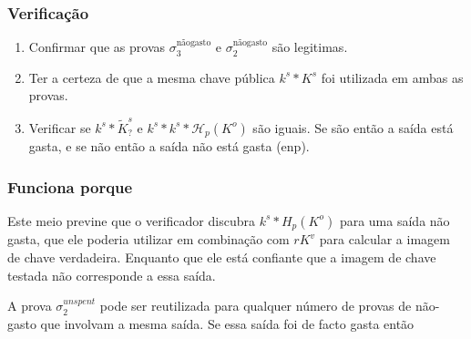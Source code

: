 
\subsubsection*{Verificação}

\begin{enumerate}
    \item Confirmar que as provas $\sigma^{\textrm{nãogasto}}_3$ e $\sigma^{\textrm{nãogasto}}_2$ são legitimas.
    \item Ter a certeza de que a mesma chave pública $k^s*K^s$ foi utilizada em ambas as provas. 
    \item Verificar se $k^s*\tilde{K}^s_?$ e $k^s*k^s*\mathcal{H}_p(K^o)$ são iguais. Se são então a saída está gasta, e se não então a saída não está gasta (enp).

\end{enumerate}{}

\subsubsection*{Funciona porque}

Este meio previne que o verificador discubra $k^s*H_p(K^o)$ para uma saída não gasta, que ele poderia utilizar em combinação com $r K^v$ para calcular a imagem de chave verdadeira.
Enquanto que ele está confiante que a imagem de chave testada não corresponde a essa saída.

A prova $\sigma^{unspent}_2$ pode ser reutilizada para qualquer número de provas de não-gasto que involvam a mesma saída. Se essa saída foi de facto gasta então  


